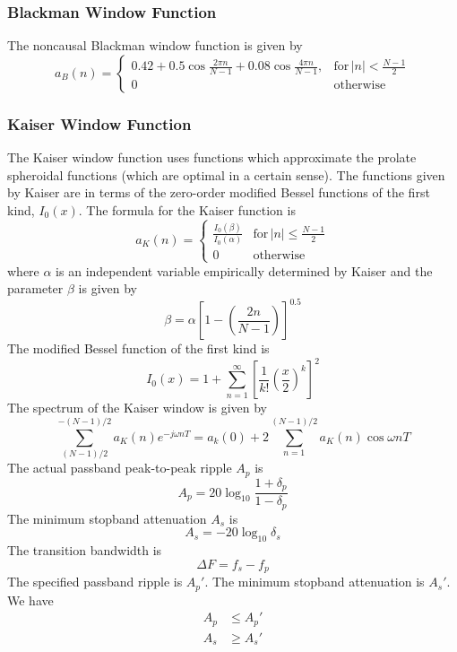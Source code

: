 \documentclass[11pt]{book}
\theoremstyle{example}
\begin{document}
\subsubsection{Blackman Window Function}
The noncausal Blackman window function is given by
\begin{equation}
	a_B(n)=
	\begin{cases}
		0.42+0.5\cos{\frac{2{\pi}n}{N-1}}+0.08\cos{\frac{4{\pi}n}{N-1}}, & \mathrm{for}\,|n|<\frac{N-1}{2}\\
		0 & \mathrm{otherwise}
	\end{cases}
\end{equation}

\subsubsection{Kaiser Window Function}
The Kaiser window function uses functions which approximate the prolate spheroidal functions (which are optimal in a certain sense). The functions given by Kaiser are in terms of the zero-order modified Bessel functions of the first kind, $I_0(x)$. The formula for the Kaiser function is
\begin{equation}
	a_K(n)=
	\begin{cases}
		\frac{I_0(\beta)}{I_0(\alpha)} & \mathrm{for}\,|n|\leq\frac{N-1}{2}\\
		0 & \mathrm{otherwise}
	\end{cases}
\end{equation}
where $\alpha$ is an independent variable empirically determined by Kaiser and the parameter $\beta$ is given by
\begin{equation}
	\beta=\alpha\left[1-\left(\frac{2n}{N-1}\right)\right]^{0.5}
\end{equation}
The modified Bessel function of the first kind is
\begin{equation}
	I_0(x)=1+\sum_{n=1}^\infty{\left[\frac{1}{k!}\left(\frac{x}{2}\right)^k\right]^2}
\end{equation}
The spectrum of the Kaiser window is given by
\begin{equation}
	\sum_{(N-1)/2}^{-(N-1)/2}{a_K(n)e^{-j{\omega}nT}}=a_k(0)+2\sum_{n=1}^{(N-1)/2}{a_K(n)\cos{{\omega}nT}}
\end{equation}
The actual passband peak-to-peak ripple $A_p$ is
\begin{equation}
	A_p=20\log_{10}{\frac{1+\delta_p}{1-\delta_p}}
\end{equation}
The minimum stopband attenuation $A_s$ is
\begin{equation}
	A_s=-20\log_{10}{\delta_s}
\end{equation}
The transition bandwidth is
\begin{equation}
	{\Delta}F=f_s-f_p
\end{equation}
The specified passband ripple is $A_p'$.
The minimum stopband attenuation is $A_s'$.
We have
\begin{align}
	A_p&{\leq}A_p'\\
	A_s&{\geq}A_s'
\end{align}
\end{document}

